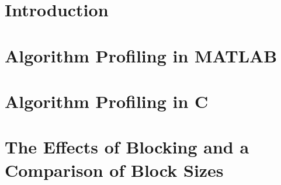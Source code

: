 \section{Introduction}
\label{software:Introduction}


\section{Algorithm Profiling in MATLAB}
\label{software:algorithmProfiling:matlab}


\section{Algorithm Profiling in C}
\label{software:algorithmProfiling:c}


\section{The Effects of Blocking and a Comparison of Block Sizes}
\label{software:blockSize}
